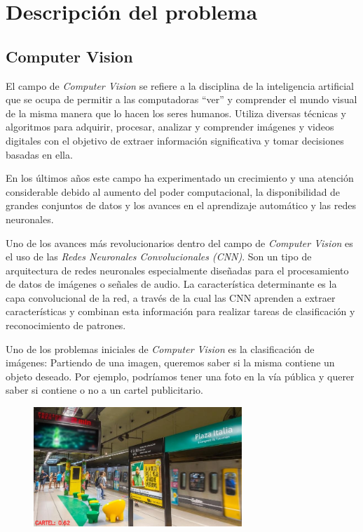 \documentclass[a4paper]{article}
\begin{document}
\section{Descripción del problema}
\subsection{Computer Vision}
El campo de \emph{Computer Vision} se refiere a la disciplina de la inteligencia artificial que se ocupa de permitir a las computadoras ``ver'' y comprender el mundo visual de la misma manera que lo hacen los seres humanos. Utiliza diversas técnicas y algoritmos para adquirir, procesar, analizar y comprender imágenes y videos digitales con el objetivo de extraer información significativa y tomar decisiones basadas en ella.

En los últimos años este campo ha experimentado un crecimiento y una atención considerable debido al aumento del poder computacional, la disponibilidad de grandes conjuntos de datos y los avances en el aprendizaje automático y las redes neuronales.

Uno de los avances más revolucionarios dentro del campo de \emph{Computer Vision} es el uso de las \emph{Redes Neuronales Convolucionales (CNN)}. Son un tipo de arquitectura de redes neuronales especialmente diseñadas para el procesamiento de datos de imágenes o señales de audio. La característica determinante es la capa convolucional de la red, a través de la cual las CNN aprenden a extraer características y combinan esta información para realizar tareas de clasificación y reconocimiento de patrones.

Uno de los problemas iniciales de \emph{Computer Vision} es la clasificación de imágenes: Partiendo de una imagen, queremos saber si la misma contiene un objeto deseado. Por ejemplo, podríamos tener una foto en la vía pública y querer saber si contiene o no a un cartel publicitario.

\begin{figure}[H]
    \includegraphics[width=0.7\textwidth]{./img/classif.jpg}
    \centering
\end{figure}
\end{document}
